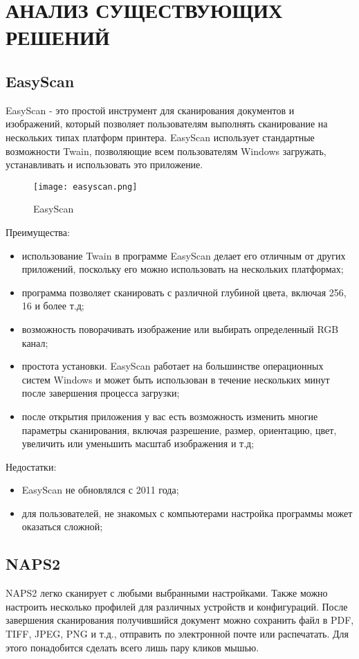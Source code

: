 \section{АНАЛИЗ СУЩЕСТВУЮЩИХ РЕШЕНИЙ}
\label{sec:solution}

\subsection{EasyScan}
EasyScan - это простой инструмент для сканирования документов и изображений, который позволяет пользователям выполнять сканирование на нескольких типах платформ принтера. EasyScan использует стандартные возможности Twain, позволяющие всем пользователям Windows загружать, устанавливать и использовать это приложение. 

\begin{figure}[h!]
	\centering
	\texttt{[image: easyscan.png]}
	\caption{EasyScan}
\end{figure}

Преимущества:
\begin{itemize}
	\item использование Twain в программе EasyScan делает его отличным от других приложений, поскольку его можно использовать на нескольких платформах;
	\item программа позволяет сканировать с различной глубиной цвета, включая 256, 16 и более т.д; 
	\item возможность поворачивать изображение или выбирать определенный RGB канал; 
	\item простота установки. EasyScan работает на большинстве операционных систем Windows и может быть использован в течение нескольких минут после завершения процесса загрузки; 
	\item после открытия приложения у вас есть возможность изменить многие параметры сканирования, включая разрешение, размер, ориентацию, цвет, увеличить или уменьшить масштаб изображения и т.д;
\end{itemize}

Недостатки:
\begin{itemize}
	\item EasyScan не обновлялся с 2011 года;
	\item для пользователей, не знакомых с компьютерами настройка программы может оказаться сложной;
\end{itemize}

\subsection{NAPS2} 
NAPS2 легко сканирует с любыми выбранными настройками. Также можно настроить несколько профилей для различных устройств и конфигураций. После завершения сканирования получившийся документ можно сохранить файл в PDF, TIFF, JPEG, PNG и т.д., отправить по электронной почте или распечатать. Для этого понадобится сделать всего лишь пару кликов мышью.


